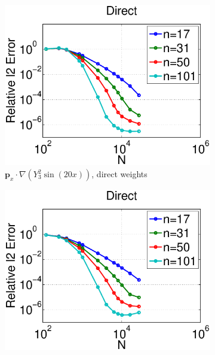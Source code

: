 \begin{figure}
	\centering
	\begin{subfigure}[t]{0.48\textwidth}
	\includegraphics[width=1.0\textwidth]{../figures/appendices/direct_vs_indirect_weights/compare_weight_generation/xsfc_vs_xsfc_alt_on_sph32_times_sine_20x/direct_rel_l2_error.eps}
	\caption{$\mathbf{p}_{x} \cdot \nabla ( Y_{3}^{2} \sin(20 x))$, direct weights}
			\label{fig:direct_vs_indirect_relative_error_xsfc_direct}
	\end{subfigure}
	\begin{subfigure}[t]{0.48\textwidth}
	\includegraphics[width=1.0\textwidth]{../figures/appendices/direct_vs_indirect_weights/compare_weight_generation/lsfc_vs_px_grad_dot_px_grad/direct_rel_l2_error.eps}

\end{subfigure}
\end{figure}
